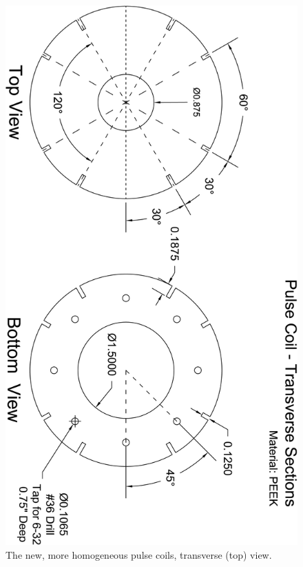 \documentclass[../PaulGanssle-Thesis.tex]{subfiles}
\begin{document}
\begin{figure}[p]
\centering
\includegraphics[height=0.95\textheight]{appendices/blueprints/PulseCoils02.png}
\caption{The new, more homogeneous pulse coils, transverse (top) view.}
\label{blueprints:NewPulseCoils02}
\end{figure}
\end{document}
